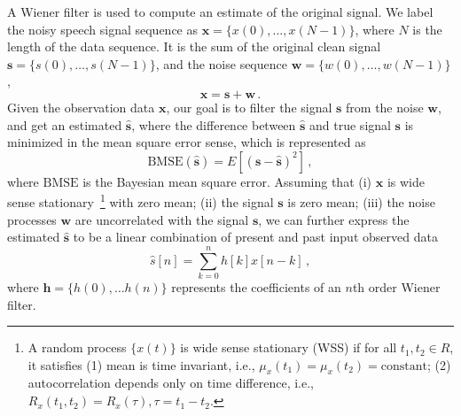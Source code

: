 \documentclass[paper-main.tex]{subfiles}
\begin{document}
A Wiener filter is used to compute an estimate of the original signal. 
We label the noisy speech signal sequence as  $\mathbf{x}=\{x(0),\dots, x(N-1)\}$, where $N$ is the length of the data sequence. 
It is the sum of the original clean signal $\mathbf{s}=\{s(0),\dots,s(N-1)\}$, and the noise sequence $\mathbf{w}=\{w(0),\dots,w(N-1)\}$, 
\begin{equation}
    \mathbf{x}=\mathbf{s}+\mathbf{w}\,.
\end{equation}
Given the observation data $\textbf{x}$, our goal is to filter the signal $\textbf{s}$ from the noise $\textbf{w}$, and get an estimated $\hat{\textbf{s}}$, where the difference between $\hat{\textbf{s}}$ and true signal $\textbf{s}$ is minimized in the mean square error sense, which is represented as
\begin{equation}
\text{BMSE}(\hat{\textbf{s}})=E[(\textbf{s}-\hat{\textbf{s}})^2]\,,
\end{equation}
where $\text{BMSE}$ is the Bayesian mean square error. 
Assuming that (i) $\textbf{x}$ is wide sense stationary~\footnote{
A random process $\{x(t)\}$ is wide sense stationary (WSS) if for all
$t_1,t_2 \in R$, it satisfies (1) mean is time invariant, i.e.,
$\mu_x(t_1)=\mu_x(t_2)=\text{constant}$; (2) autocorrelation depends
only on time difference, i.e., $R_x(t_1,t_2)=R_x(\tau),\tau=t_1-t_2$.} 
with zero mean; (ii) the signal $\textbf{s}$ is zero mean; (iii) the noise processes $\textbf{w}$ are uncorrelated with the signal $\textbf{s}$, we can further express the estimated $\hat{\textbf{s}}$ to be a linear combination of present and past input observed data
\begin{equation}
\hat{{s}}[n]=\sum_{k=0}^{n}h[k]x[n-k]\,,
\end{equation}
where $\textbf{h}=\{h(0),\dots h(n)\}$ represents the coefficients of an $n$th order Wiener filter.
\end{document}
